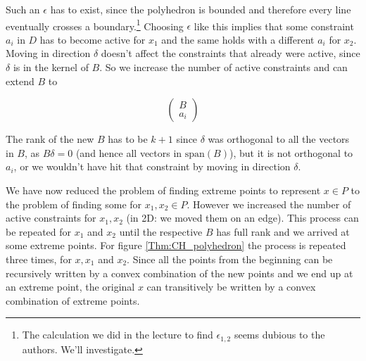 \begin{pr}
\begin{description}
Such an $\epsilon$ has to exist, since the polyhedron is bounded and therefore every line eventually crosses a boundary.\footnote{The calculation we did in the lecture to find $\epsilon_{1,2}$ seems dubious to the authors. We'll investigate.} Choosing $\epsilon$ like this implies that some constraint $a_i$ in $D$ has to become active for $x_1$ and the same holds with a different $a_i$ for $x_2$. Moving in direction $\delta$ doesn't affect the constraints that already were active, since $\delta$ is in the kernel of $B$. So we increase the number of active constraints and can extend $B$ to 

\[\begin{pmatrix}B\\ a_i\end{pmatrix}\] 

The rank of the new $B$ has to be $k+1$ since $\delta$ was orthogonal to all the vectors in $B$, as $B\delta=0$ (and hence all vectors in $\text{span}(B)$), but it is not orthogonal to $a_i$, or we wouldn't have hit that constraint by moving in direction $\delta$.

We have now reduced the problem of finding extreme points to represent $x \in P$ to the problem of finding some for $x_1,x_2 \in P$. However we increased the number of active constraints for $x_1,x_2$ (in 2D: we moved them on an edge). This process can be repeated for $x_1$ and $x_2$ until the respective $B$ has full rank and we arrived at some extreme points. For figure \ref{Thm:CH_polyhedron} the process is repeated three times, for $x,x_1$ and $x_2$. 
Since all the points from the beginning can be recursively written by a convex combination of the new points and we end up at an extreme point, the original $x$ can transitively be written by a convex combination of extreme points.
\end{description}

%




\end{pr}

